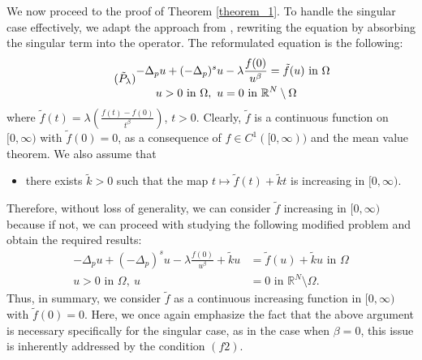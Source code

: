 \documentclass[reqno,oneside]{amsart}
\theoremstyle{definition}
\theoremstyle{remark}
\numberwithin{equation}{section}
\newcommand{\p}{\Delta_p}
\newcommand{\ps}{(-\Delta_p)^s}
\newcommand{\la} {\lambda}
\newcommand{\ba}{\beta}
\newcommand{\Om} {\Omega}
\newcommand{\bdry}{\mathbb{R}^N \setminus \Omega}
\newcommand{\ftil}{\tilde{f}}
\begin{document}
We now proceed to the proof of Theorem \ref{theorem_1}. To handle the singular case effectively, we adapt the approach from \cite{dhanya2015three}, rewriting the equation by absorbing the singular term into the operator. The reformulated equation is the following:
\begin{equation}\tag{$\tilde{P}_{\la}$}\label{P_lambda_tilde}
    \begin{aligned}
        -\p u + \ps u &-\la \frac{f(0)}{u^{\ba}} = \tilde{f}(u) \text{ in } \Om\\
        u >0 \text{ in } \Om,\ u &=0 \text{ in } \bdry
    \end{aligned}
\end{equation}
where $\ftil (t) = \la \left(\frac{f(t)-f(0)}{t^{\ba}}\right)$, $t>0$. Clearly, $\ftil$ is a continuous function on $[0,\infty)$ with $\ftil (0)=0$, as a consequence of $f\in C^1([0,\infty))$ and the mean value theorem. We also assume that
\begin{itemize}
    \item[$(h)$] there exists $\tilde{k}>0$ such that the map $t \mapsto \ftil (t) +\tilde{k} t$ is increasing in $[0,\infty)$.
\end{itemize}
Therefore, without loss of generality, we can consider $\ftil$ increasing in $[0,\infty)$ because if not, we can proceed with studying the following modified problem and obtain the required results:
\begin{equation*}
    \begin{aligned}
        -\p u + \ps u -\la \frac{f(0)}{u^{\ba}} + \tilde{k}u &= \tilde{f}(u) +\tilde{k} u \text{ in } \Om\\
        u >0 \text{ in } \Om,\ u &=0 \text{ in } \bdry.
    \end{aligned}
\end{equation*}
Thus, in summary, we consider $\ftil$ as a continuous increasing function in $[0,\infty)$ with $\ftil (0) =0$. Here, we once again emphasize the fact that the above argument is necessary specifically for the singular case, as in the case when $\ba =0$, this issue is inherently addressed by the condition $(f2)$.
\end{document}
